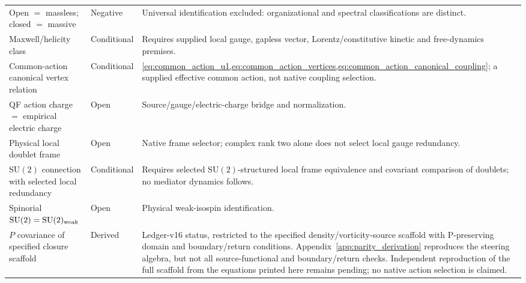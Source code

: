 \documentclass[11pt]{article}
\theoremstyle{definition}
\newcommand{\SUtwo}{\mathrm{SU}(2)}
\begin{document}
\begin{longtable}{>{\raggedright\arraybackslash}p{}
                  >{\raggedright\arraybackslash}p{}
                  >{\raggedright\arraybackslash}p{}}
Open $=$ massless; closed $=$ massive & Negative & Universal identification excluded: organizational and spectral classifications are distinct.\\
Maxwell/helicity class & Conditional & Requires supplied local gauge, gapless vector, Lorentz/constitutive kinetic and free-dynamics premises.\\
Common-action canonical vertex relation & Conditional & \cref{eq:common_action_u1,eq:common_action_vertices,eq:common_action_canonical_coupling}; a supplied effective common action, not native coupling selection.\\
QF action charge $=$ empirical electric charge & Open & Source/gauge/electric-charge bridge and normalization.\\
Physical local doublet frame & Open & Native frame selector; complex rank two alone does not select local gauge redundancy.\\
$\SUtwo$ connection with selected local redundancy & Conditional & Requires selected $\SUtwo$-structured local frame equivalence and covariant comparison of doublets; no mediator dynamics follows.\\
Spinorial $\SUtwo=\SUtwo_{\rm weak}$ & Open & Physical weak-isospin identification.\\

$P$ covariance of specified closure scaffold & Derived &
Ledger-v16 status, restricted to the specified density/vorticity-source
scaffold with P-preserving domain and boundary/return conditions.
Appendix~\ref{app:parity_derivation} reproduces the steering algebra,
but not all source-functional and boundary/return checks.
Independent reproduction of the full scaffold from the equations
printed here remains pending; no native action selection is claimed.\\


\end{longtable}
\end{document}
